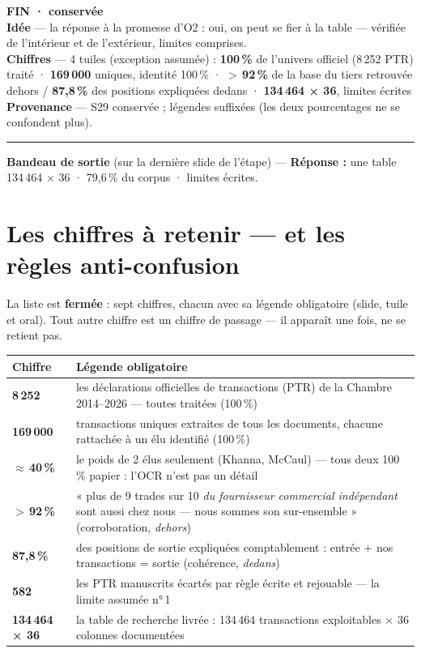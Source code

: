 \documentclass[11pt,a4paper]{article}
\newcommand{\fiche}[5]{%
  \par\noindent\begin{minipage}{\linewidth}
  \vspace{2mm}
  {\color{helec}\textbf{#1}}\quad{\textbf{« #2 »}}\\[1mm]
  {\small\textbf{Idée} --- #3}\\[0.8mm]
  {\small\textbf{Chiffres} --- #4}\\[0.8mm]
  {\small\color{black!55}\textbf{Provenance} --- #5}\\[1mm]
  {\color{black!18}\rule{\linewidth}{0.4pt}}
  \end{minipage}\par}
\newcommand{\reponse}[1]{\par\noindent\colorbox{okgreen!10}{\parbox{\dimexpr\linewidth-8pt}{\small
  \textbf{\textcolor{okgreen}{Bandeau de sortie}} (sur la dernière slide de l'étape) --- \textbf{Réponse :} #1}}\par\vspace{1mm}}
\begin{document}
\fiche{FIN · conservée}{La couche données, en quatre chiffres}{la réponse à la promesse
d'O2 : oui, on peut se fier à la table --- vérifiée de l'intérieur et de l'extérieur,
limites comprises.}{4 tuiles (exception assumée) : \textbf{100\,\%} de l'univers officiel
(8\,252 PTR) traité · \textbf{169\,000} uniques, identité 100\,\% · \textbf{$>$\,92\,\%}
de la base du tiers retrouvée dehors / \textbf{87,8\,\%} des positions expliquées dedans ·
\textbf{134\,464 × 36}, limites écrites}{S29 conservée ; légendes suffixées (les deux
pourcentages ne se confondent plus).}

\reponse{une table 134\,464 × 36 · 79,6\,\% du corpus · limites écrites.}

\section{Les chiffres à retenir --- et les règles anti-confusion}
\label{sec:chiffres}

La liste est \textbf{fermée} : sept chiffres, chacun avec sa légende obligatoire (slide,
tuile et oral). Tout autre chiffre est un chiffre de passage --- il apparaît une fois, ne
se retient pas.

\begin{center}\small
\begin{tabular}{@{}l >{\raggedright\arraybackslash}p{11.2cm}@{}}
\toprule
\textbf{Chiffre} & \textbf{Légende obligatoire} \\
\midrule
\textbf{8\,252}        & les déclarations officielles de transactions (PTR) de la Chambre 2014--2026 --- toutes traitées (100\,\%) \\
\textbf{169\,000}      & transactions uniques extraites de tous les documents, chacune rattachée à un élu identifié (100\,\%) \\
\textbf{$\approx$\,40\,\%} & le poids de 2 élus seulement (Khanna, McCaul) --- tous deux 100\,\% papier : l'OCR n'est pas un détail \\
\textbf{$>$\,92\,\%}   & « plus de 9 trades sur 10 \emph{du fournisseur commercial indépendant} sont aussi chez nous --- nous sommes son sur-ensemble » (corroboration, \emph{dehors}) \\
\textbf{87,8\,\%}      & des positions de sortie expliquées comptablement : entrée + nos transactions = sortie (cohérence, \emph{dedans}) \\
\textbf{582}           & les PTR manuscrits écartés par règle écrite et rejouable --- la limite assumée n°\,1 \\
\textbf{134\,464 × 36} & la table de recherche livrée : 134\,464 transactions exploitables × 36 colonnes documentées \\
\bottomrule
\end{tabular}
\end{center}
\end{document}

